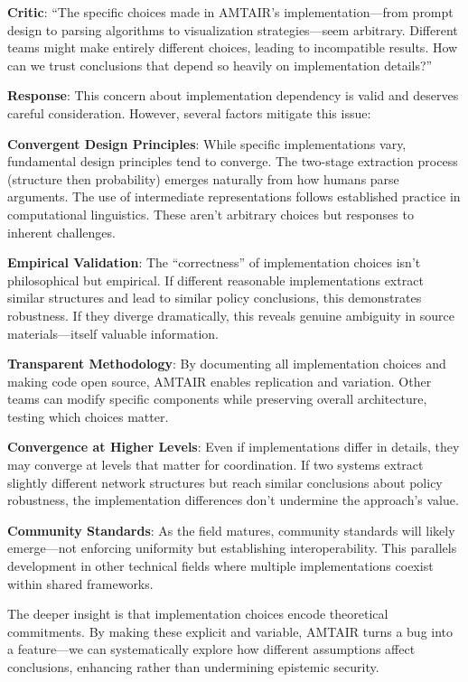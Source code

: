 \documentclass[
  11pt,
  letterpaper,
  openany]{book}
\begin{document}
\textbf{Critic}: ``The specific choices made in AMTAIR's
implementation---from prompt design to parsing algorithms to
visualization strategies---seem arbitrary. Different teams might make
entirely different choices, leading to incompatible results. How can we
trust conclusions that depend so heavily on implementation details?''

\textbf{Response}: This concern about implementation dependency is valid
and deserves careful consideration. However, several factors mitigate
this issue:

\textbf{Convergent Design Principles}: While specific implementations
vary, fundamental design principles tend to converge. The two-stage
extraction process (structure then probability) emerges naturally from
how humans parse arguments. The use of intermediate representations
follows established practice in computational linguistics. These aren't
arbitrary choices but responses to inherent challenges.

\textbf{Empirical Validation}: The ``correctness'' of implementation
choices isn't philosophical but empirical. If different reasonable
implementations extract similar structures and lead to similar policy
conclusions, this demonstrates robustness. If they diverge dramatically,
this reveals genuine ambiguity in source materials---itself valuable
information.

\textbf{Transparent Methodology}: By documenting all implementation
choices and making code open source, AMTAIR enables replication and
variation. Other teams can modify specific components while preserving
overall architecture, testing which choices matter.

\textbf{Convergence at Higher Levels}: Even if implementations differ in
details, they may converge at levels that matter for coordination. If
two systems extract slightly different network structures but reach
similar conclusions about policy robustness, the implementation
differences don't undermine the approach's value.

\textbf{Community Standards}: As the field matures, community standards
will likely emerge---not enforcing uniformity but establishing
interoperability. This parallels development in other technical fields
where multiple implementations coexist within shared frameworks.

The deeper insight is that implementation choices encode theoretical
commitments. By making these explicit and variable, AMTAIR turns a bug
into a feature---we can systematically explore how different assumptions
affect conclusions, enhancing rather than undermining epistemic
security.
\end{document}
